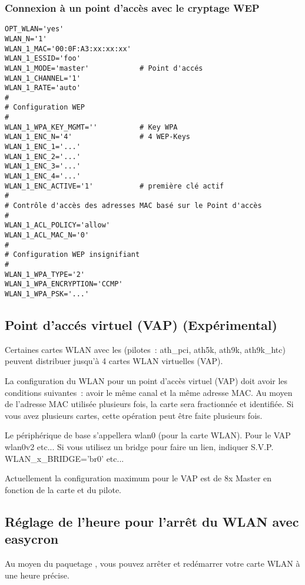 \subsubsection{Connexion à un point d'accès avec le cryptage WEP}

\begin{example}
\begin{verbatim}
OPT_WLAN='yes'
WLAN_N='1'
WLAN_1_MAC='00:0F:A3:xx:xx:xx'
WLAN_1_ESSID='foo'
WLAN_1_MODE='master'            # Point d'accés
WLAN_1_CHANNEL='1'
WLAN_1_RATE='auto'
#
# Configuration WEP
#
WLAN_1_WPA_KEY_MGMT=''          # Key WPA
WLAN_1_ENC_N='4'                # 4 WEP-Keys
WLAN_1_ENC_1='...'
WLAN_1_ENC_2='...'
WLAN_1_ENC_3='...'
WLAN_1_ENC_4='...'
WLAN_1_ENC_ACTIVE='1'           # première clé actif
#
# Contrôle d'accès des adresses MAC basé sur le Point d'accès
#
WLAN_1_ACL_POLICY='allow'
WLAN_1_ACL_MAC_N='0'
# 
# Configuration WEP insignifiant
#
WLAN_1_WPA_TYPE='2'
WLAN_1_WPA_ENCRYPTION='CCMP'
WLAN_1_WPA_PSK='...'
\end{verbatim}
\end{example}


\subsection{Point d'accés virtuel (VAP) (Expérimental)}

Certaines cartes WLAN avec les (pilotes~: ath\_pci, ath5k, ath9k, ath9k\_htc)
peuvent distribuer jusqu'à 4 cartes WLAN virtuelles (VAP).

La configuration du WLAN pour un point d'accès virtuel (VAP) doit avoir les
conditions suivantes~: avoir le même canal et la même adresse MAC. Au moyen de
l'adresse MAC utilisée plusieurs fois, la carte sera fractionnée et identifiée.
Si vous avez plusieurs cartes, cette opération peut être faite plusieurs fois.

Le périphérique de base s'appellera wlan0 (pour la carte WLAN). Pour le VAP
wlan0v2 etc... Si vous utilisez un bridge pour faire un lien, indiquer S.V.P.
WLAN\_x\_BRIDGE='br0' etc...

Actuellement la configuration maximum pour le VAP est de 8x Master en fonction
de la carte et du pilote.


\subsection{Réglage de l'heure pour l'arrêt du WLAN avec easycron}

Au moyen du paquetage , vous pouvez
arrêter et redémarrer votre carte WLAN à une heure précise.

